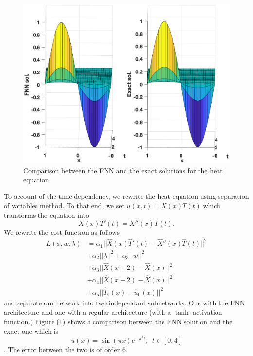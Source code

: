 \documentclass[AMS,STIX1COL]{WileyNJD-v2}
\begin{document}
  \begin{figure}[!htb]
    \centering
    \includegraphics[width=.8\textwidth]{fnnvsexactheat.eps}
    \caption{Comparison between the FNN and the exact solutions for the heat equation}
    \label{fig:fnnvsexactheat}
\end{figure}
To account of the time dependency, we rewrite the heat equation using separation of variables method. To that end, we set $u(x,t) = X(x)T(t)$ which transforms the equation into 
$$X(x)T'(t) = X''(x)T(t).$$
We rewrite the cost function as follows 
\begin{align*}
    L(\phi, w, \lambda) &= \alpha_1||\hat{X}(x)\hat{T}'(t)-\hat{X}''(x)\hat{T}(t)||^2  \\ &+\alpha_2||\lambda||^2 + \alpha_3||w||^2 \\ 
    &+\alpha_3 ||\hat{X}(x + 2) - \hat{X}(x)||^2 \\
    &+\alpha_4||\hat{X}(x - 2) - \hat{X}(x)||^2  \\
   &+ \alpha_5||\hat{T}_0(x) - \hat{u}_0(x)||^2
\end{align*}
and separate our network into two independant subnetworks. One with the FNN architecture and one with a regular architecture (with a $\tanh$ activation function.)
 Figure (\ref{fig:fnnvsexactheat}) shows a comparison between the FNN solution and the exact one which is $$u(x) = \sin(\pi x)e^{-\pi^2 t}, \;\; t \in [0,4]$$. The error between the two is of order $6$. \\
\end{document}
